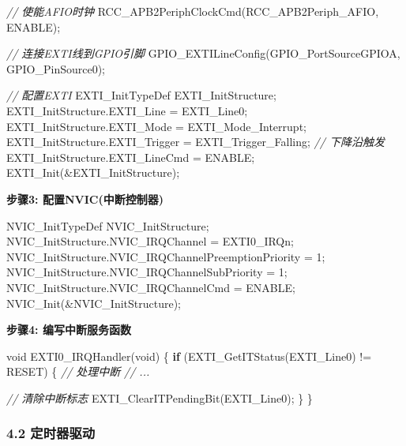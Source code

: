 \documentclass[
]{article}
\newenvironment{Shaded}{}{}
\newcommand{\CommentTok}[1]{\textcolor[rgb]{0.38,0.63,0.69}{\textit{#1}}}
\newcommand{\ControlFlowTok}[1]{\textcolor[rgb]{0.00,0.44,0.13}{\textbf{#1}}}
\newcommand{\DataTypeTok}[1]{\textcolor[rgb]{0.56,0.13,0.00}{#1}}
\newcommand{\DecValTok}[1]{\textcolor[rgb]{0.25,0.63,0.44}{#1}}
\newcommand{\NormalTok}[1]{#1}
\begin{document}
\begin{Shaded}
\begin{Highlighting}[]
\CommentTok{// 使能AFIO时钟}
\NormalTok{RCC\_APB2PeriphClockCmd(RCC\_APB2Periph\_AFIO, ENABLE);}

\CommentTok{// 连接EXTI线到GPIO引脚}
\NormalTok{GPIO\_EXTILineConfig(GPIO\_PortSourceGPIOA, GPIO\_PinSource0);}

\CommentTok{// 配置EXTI}
\NormalTok{EXTI\_InitTypeDef EXTI\_InitStructure;}
\NormalTok{EXTI\_InitStructure.EXTI\_Line = EXTI\_Line0;}
\NormalTok{EXTI\_InitStructure.EXTI\_Mode = EXTI\_Mode\_Interrupt;}
\NormalTok{EXTI\_InitStructure.EXTI\_Trigger = EXTI\_Trigger\_Falling;  }\CommentTok{// 下降沿触发}
\NormalTok{EXTI\_InitStructure.EXTI\_LineCmd = ENABLE;}
\NormalTok{EXTI\_Init(\&EXTI\_InitStructure);}
\end{Highlighting}
\end{Shaded}

\textbf{步骤3: 配置NVIC(中断控制器)}

\begin{Shaded}
\begin{Highlighting}[]
\NormalTok{NVIC\_InitTypeDef NVIC\_InitStructure;}
\NormalTok{NVIC\_InitStructure.NVIC\_IRQChannel = EXTI0\_IRQn;}
\NormalTok{NVIC\_InitStructure.NVIC\_IRQChannelPreemptionPriority = }\DecValTok{1}\NormalTok{;}
\NormalTok{NVIC\_InitStructure.NVIC\_IRQChannelSubPriority = }\DecValTok{1}\NormalTok{;}
\NormalTok{NVIC\_InitStructure.NVIC\_IRQChannelCmd = ENABLE;}
\NormalTok{NVIC\_Init(\&NVIC\_InitStructure);}
\end{Highlighting}
\end{Shaded}

\textbf{步骤4: 编写中断服务函数}

\begin{Shaded}
\begin{Highlighting}[]
\DataTypeTok{void}\NormalTok{ EXTI0\_IRQHandler(}\DataTypeTok{void}\NormalTok{)}
\NormalTok{\{}
    \ControlFlowTok{if}\NormalTok{ (EXTI\_GetITStatus(EXTI\_Line0) != RESET) \{}
        \CommentTok{// 处理中断}
        \CommentTok{// ...}
        
        \CommentTok{// 清除中断标志}
\NormalTok{        EXTI\_ClearITPendingBit(EXTI\_Line0);}
\NormalTok{    \}}
\NormalTok{\}}
\end{Highlighting}
\end{Shaded}

\hypertarget{ux5b9aux65f6ux5668ux9a71ux52a8}{%
\subsubsection{4.2 定时器驱动}\label{ux5b9aux65f6ux5668ux9a71ux52a8}}
\end{document}
